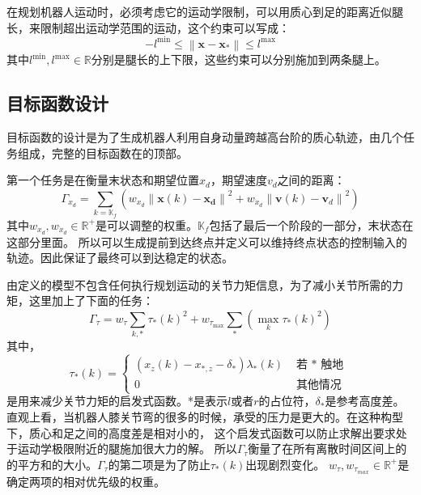 在规划机器人运动时，必须考虑它的运动学限制，可以用质心到足的距离近似腿长，来限制超出运动学范围的运动，这个约束可以写成：
\begin{equation}
    \label{equ:kine_constraint}
    -l^{\min } \leq\left\|\boldsymbol{x}-\boldsymbol{x}_*\right\| \leq l^{\max }
\end{equation}
其中$l^{\min}, l^{\max} \in \mathbb{R}$分别是腿长的上下限，这些约束可以分别施加到两条腿上。
\subsection{目标函数设计}
\label{cost_function}
目标函数的设计是为了生成机器人利用自身动量跨越高台阶的质心轨迹，由几个任务组成，完整的目标函数在的顶部。

第一个任务是在衡量末状态和期望位置${x}_d$，期望速度${v}_d$之间的距离：
\begin{equation}
    \label{equ:cost_1}
    \Gamma_{x_d}=\sum_{k=\mathbb{K}_f}\left(w_{x_d}\left\|\boldsymbol{x}(k)-\boldsymbol{x}_{\boldsymbol{d}}\right\|^2+w_{\dot{x}_d}\left\|\boldsymbol{v}(k)-\boldsymbol{v}_d\right\|^2\right)
\end{equation}
其中$w_{x_d}, w_{\dot{x}_d} \in \mathbb{R}^{+}$是可以调整的权重。$\mathbb{K}_f$包括了最后一个阶段的一部分，末状态在这部分里面。
所以可以生成提前到达终点并定义可以维持终点状态的控制输入的轨迹。因此保证了最终可以到达稳定的状态。

由定义的模型不包含任何执行规划运动的关节力矩信息，为了减小关节所需的力矩，这里加上了下面的任务：
\begin{equation}
    \label{equ:cost_2}
    \Gamma_\tau=w_\tau \sum_{k, *} \tau_*(k)^2+w_{\tau_{\max }} \sum_*\left(\max _k \tau_*(k)^2\right)
\end{equation}
其中，
\begin{equation}
    \label{equ:tau}
    \tau_*(k)= \begin{cases}\left(x_z(k)-x_{*, z}-\delta_*\right) \lambda_*(k) & \text { 若 } * \text { 触地 } \\ 0 & \text { 其他情况 }\end{cases}
\end{equation}
是用来减少关节力矩的启发式函数。*是表示$l$或者$r$的占位符，$\delta_*$是参考高度差。
直观上看，当机器人膝关节弯的很多的时候，承受的压力是更大的。在这种构型下，质心和足之间的高度差是相对小的，
这个启发式函数可以防止求解出要求处于运动学极限附近的腿施加很大力的解。
所以$\Gamma_\tau$衡量了在所有离散时间区间上的的平方和的大小。$\Gamma_\tau$的第二项是为了防止$\tau_*(k)$出现剧烈变化。
$w_{\tau}, w_{\tau_{max}} \in \mathbb{R}^+$是确定两项的相对优先级的权重。

